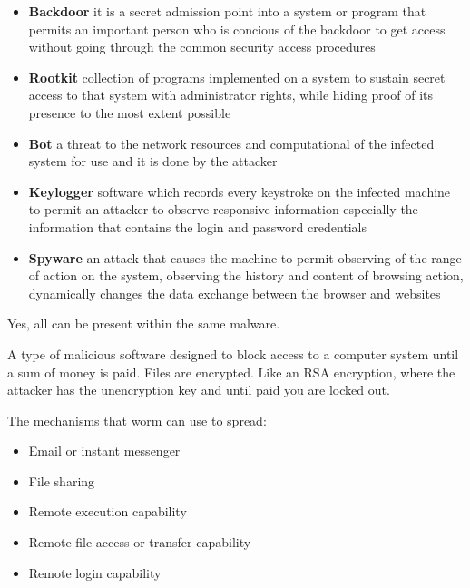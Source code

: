 \documentclass[../CIT288SecurityResearchNotebook.tex]{subfiles}
\begin{document}

\begin{itemize}
\item{\bf{Backdoor}} it is a secret admission point into a system or program that permits an important person who is concious of the backdoor to get access without going through the common security access procedures
\item{\bf{Rootkit}} collection of programs implemented on a system to sustain secret access
	to that system with administrator rights, while hiding proof of its presence to the most extent possible
\item{\bf{Bot}} a threat to the network resources and computational of the infected system for use and it is done by the attacker
\item{\bf{Keylogger}} software which records every keystroke on the infected machine to permit an attacker to observe responsive information especially the information that contains the login and password credentials
\item{\bf{Spyware}} an attack that causes the machine to permit observing of the range of action on the system, observing the history and content of browsing action, dynamically changes the data exchange between the browser and websites
\end{itemize}
Yes, all can be present within the same malware.


A type of malicious software designed to block access to a computer system until a sum
of money is paid. Files are encrypted. Like an RSA encryption, where the attacker has
the unencryption key and until paid you are locked out.


The mechanisms that worm can use to spread:
\begin{itemize}
	\item{Email or instant messenger} 
	\item{File sharing} 
	\item{Remote execution capability} 
	\item{Remote file access or transfer capability} 
	\item{Remote login capability} 
\end{itemize}
\end{document}
